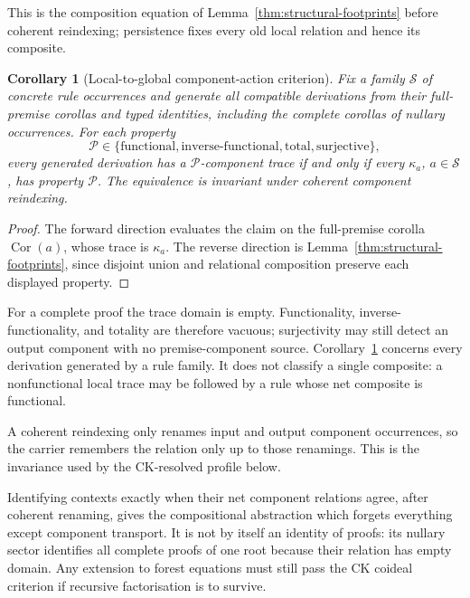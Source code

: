\documentclass[10pt,a4paper]{article}
\theoremstyle{plain}
\newtheorem{corollary}[theorem]{Corollary}
\theoremstyle{definition}
\theoremstyle{remark}
\begin{document}
This is the composition equation of
Lemma~\ref{thm:structural-footprints} before coherent reindexing;
persistence fixes every old local relation and hence its composite.

\begin{corollary}[Local-to-global component-action criterion]
\label{cor:local-global-component-action}
Fix a family \(\mathcal S\) of concrete rule occurrences and generate
all compatible derivations from their full-premise corollas and typed
identities, including the complete corollas of nullary occurrences.  For
each property
\[
 \mathcal P\in
 \{\text{functional},\text{inverse-functional},
   \text{total},\text{surjective}\},
\]
every generated derivation has a \(\mathcal P\)-component trace if and only
if every \(\kappa_a\), \(a\in\mathcal S\), has property \(\mathcal P\).
The equivalence is invariant under coherent component reindexing.
\end{corollary}

\begin{proof}
The forward direction evaluates the claim on the full-premise corolla
\(\operatorname{Cor}(a)\), whose trace is \(\kappa_a\).  The reverse
direction is Lemma~\ref{thm:structural-footprints}, since disjoint union
and relational composition preserve each displayed property.
\end{proof}

For a complete proof the trace domain is empty.  Functionality,
inverse-functionality, and totality are therefore vacuous; surjectivity may
still detect an output component with no premise-component source.
Corollary~\ref{cor:local-global-component-action} concerns every derivation
generated by a rule family.  It does not classify a single composite: a
nonfunctional local trace may be followed by a rule whose net composite is
functional.

A coherent reindexing only renames input and output component occurrences,
so the carrier remembers the relation only up to those renamings.  This is
the invariance used by the CK-resolved profile below.

Identifying contexts exactly when their net component relations agree,
after coherent renaming, gives the compositional abstraction which forgets
everything except component transport.  It is not by itself an identity of proofs:
its nullary sector identifies all complete proofs of one root because their
relation has empty domain.  Any extension to forest equations must still
pass the CK coideal criterion if recursive factorisation is to survive.
\end{document}
